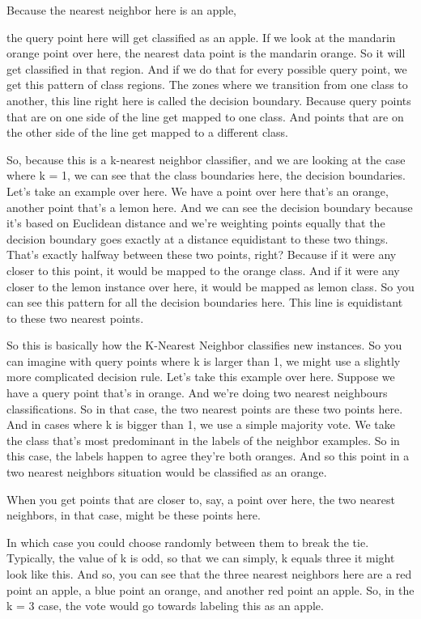 \begin{multicols}{2}
Because the nearest neighbor here is an apple, 

the query point here will get classified as an apple. If we look at the mandarin orange point over here, the nearest data point is the mandarin orange. So it will get classified in that region. And if we do that for every possible query point, we get this pattern of class regions. The zones where we transition from one class to another, this line right here is called the decision boundary. Because query points that are on one side of the line get mapped to one class. And points that are on the other side of the line get mapped to a different class. 

So, because this is a k-nearest neighbor classifier, and we are looking at the case where k = 1, we can see that the class boundaries here, the decision boundaries. Let's take an example over here. We have a point over here that's an orange, another point that's a lemon here. And we can see the decision boundary because it's based on Euclidean distance and we're weighting points equally that the decision boundary goes exactly at a distance equidistant to these two things. That's exactly halfway between these two points, right? Because if it were any closer to this point, it would be mapped to the orange class. And if it were any closer to the lemon instance over here, it would be mapped as lemon class. So you can see this pattern for all the decision boundaries here. This line is equidistant to these two nearest points. 

So this is basically how the K-Nearest Neighbor classifies new instances. So you can imagine with query points where k is larger than 1, we might use a slightly more complicated decision rule. Let's take this example over here. Suppose we have a query point that's in orange. And we're doing two nearest neighbours classifications. So in that case, the two nearest points are these two points here. And in cases where k is bigger than 1, we use a simple majority vote. We take the class that's most predominant in the labels of the neighbor examples. So in this case, the labels happen to agree they're both oranges. And so this point in a two nearest neighbors situation would be classified as an orange. 

When you get points that are closer to, say, a point over here, the two nearest neighbors, in that case, might be these points here. 

In which case you could choose randomly between them to break the tie. Typically, the value of k is odd, so that we can simply, k equals three it might look like this. And so, you can see that the three nearest neighbors here are a red point an apple, a blue point an orange, and another red point an apple. So, in the k = 3 case, the vote would go towards labeling this as an apple. 


\end{multicols}
